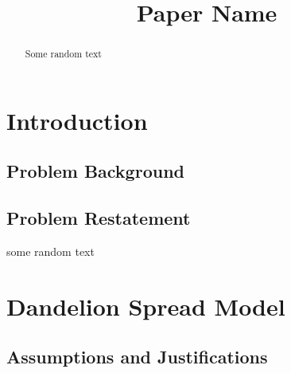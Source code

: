 \documentclass[12pt]{article}
\title{Paper Name}  %
\begin{document}
\begin{abstract}

	Some random text
	
\end{abstract}

\maketitle
\tableofcontents

\section{Introduction}

	\subsection{Problem Background}
		
		
		
	\subsection{Problem Restatement}
	
		some random text

\section{Dandelion Spread Model}

	\subsection{Assumptions and Justifications}
	
\end{document}

